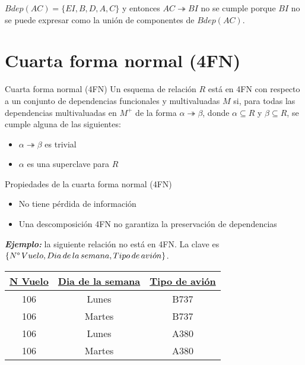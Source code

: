 \documentclass[a4paper, twoside]{article}
\begin{document}
$Bdep(AC)=\{EI,B,D,A,C\}$ y entonces $AC\twoheadrightarrow BI$ no se cumple porque $BI$ no se puede expresar como la unión de componentes de $Bdep(AC)$.

\section{Cuarta forma normal (4FN)}
\begin{definicion}[0.9\textwidth]{Cuarta forma normal (4FN)}
	Un esquema de relación $R$ está en 4FN con respecto a un conjunto de dependencias funcionales y multivaluadas $M$ si, para todas las dependencias multivaluadas en $M^{+}$ de la forma $\alpha \twoheadrightarrow \beta$, donde $\alpha \subseteq R$ y $\beta \subseteq R$, se cumple alguna de las siguientes:
	\begin{itemize}
		\item $\alpha \twoheadrightarrow \beta$ es trivial
		\item $\alpha$ es una superclave para $R$ 
	\end{itemize}
\end{definicion}

\begin{propiedades}[0.9\textwidth]{Propiedades de la cuarta forma normal (4FN)}
	\begin{itemize}
		\item No tiene pérdida de información
		\item Una descomposición 4FN no garantiza la preservación de dependencias
	\end{itemize}
\end{propiedades}

\textbf{\emph{Ejemplo:}} la siguiente relación no está en 4FN. La clave es $\left\{ N \text{\textdegree}\, Vuelo, Dia\, de\, la\, semana, Tipo\, de\, avi\acute{o}n \right\}$. 

\begin{center}
	\begin{tabular}{|c|c|c|}
		\hline 
		\uline{N\textdegree{} Vuelo} & \uline{Dia de la semana} & \uline{Tipo de avión}\\
		\hline 
		\hline 
		106 & Lunes & B737\\
		\hline 
		106 & Martes  & B737\\
		\hline 
		106 & Lunes & A380\\
		\hline 
		106 & Martes & A380\\
		\hline 
	\end{tabular}
\end{center}
\end{document}
